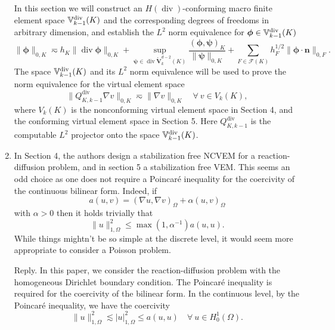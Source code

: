 \documentclass[10pt]{amsart}
\theoremstyle{definition}
\theoremstyle{remark}
\renewcommand{\div}{\operatorname{div}}
\begin{document}
\begin{enumerate}[1.]
In this section we will construct an $H(\div)$-conforming macro finite element space $\mathbb{V}_{k-1}^{\rm div}(K)$ and the corresponding degrees of freedoms in arbitrary dimension, and establish the $L^2$ norm equivalence for $\boldsymbol{\phi}\in\mathbb{V}_{k-1}^{\rm div}(K)$
\begin{equation*}%
\|\boldsymbol{\phi}\|_{0,K}\eqsim h_K\|\div\boldsymbol{\phi}\|_{0,K} + \sup_{\boldsymbol{\psi}\in\div\mathring{\boldsymbol{V}}_{k}^{d-2}(K)}\frac{(\boldsymbol{\phi}, \boldsymbol{\psi})_K}{\|\boldsymbol{\psi}\|_{0,K}} +\sum_{F\in\mathcal F(K)}h_F^{1/2}\|\boldsymbol{\phi}\cdot\boldsymbol{n}\|_{0,F}.
\end{equation*}
The space $\mathbb{V}_{k-1}^{\rm div}(K)$ and its $L^2$ norm equivalence will be used to prove
the norm equivalence for the virtual element space
\begin{equation*}%
\|Q_{K,k-1}^{\div}\nabla v\|_{0,K}\eqsim \|\nabla v\|_{0,K} \quad \forall~v\in V_k(K),
\end{equation*}
where $V_k(K)$ is the nonconforming virtual element space in Section 4, and the conforming virtual element space in Section 5. Here $Q_{K,k-1}^{\div}$ is the computable $L^2$ projector onto the space $\mathbb{V}_{k-1}^{\rm div}(K)$.


\medskip

\item \textsf{In Section 4, the authors design a stabilization free NCVEM for a reaction-diffusion problem, and in section 5 a stabilization free VEM. This seems an odd choice as one does not require a Poincar\'e inequality for the coercivity of the continuous bilinear form. Indeed, if
$$
a(u, v)=(\nabla u, \nabla v)_{\Omega}+\alpha (u, v)_{\Omega}
$$
with $\alpha > 0$ then it holds trivially that
$$
\|u\|_{1,\Omega}^2\leq\max(1,\alpha^{-1})a(u,u).
$$
While things mightn't be so simple at the discrete level, it would seem more
appropriate to consider a Poisson problem.}

\smallskip \noindent \textcolor[rgb]{1.00,0.00,0.00}{Reply.} 
In this paper, we consider the reaction-diffusion problem with the homogeneous Dirichlet boundary condition. The Poincar\'e inequality is required for the coercivity of the bilinear form. In the continuous level, by the Poincar\'e inequality, we have the coercivity
\[
\|u\|_{1,\Omega}^2\lesssim |u|_{1,\Omega}^2\leq a(u,u)\quad \forall~u\in H_0^1(\Omega).
\]


\end{enumerate}
\end{document}
